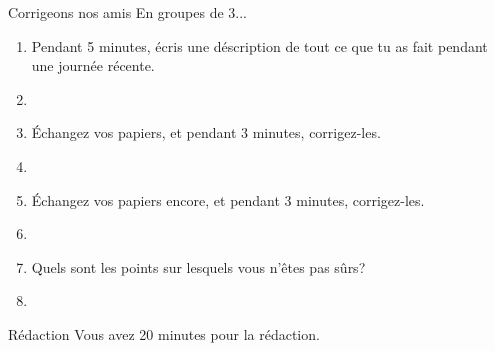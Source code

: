 \documentclass{beamer}
\begin{document}
  \begin{frame}{Corrigeons nos amis}
    En groupes de 3...
    \begin{enumerate}
      \item Pendant 5 minutes, écris une déscription de tout ce que tu as fait pendant une journée récente.
      \item[] 
      \item<2-> Échangez vos papiers, et pendant 3 minutes, corrigez-les.
      \item<2->[] 
      \item<3-> Échangez vos papiers encore, et pendant 3 minutes, corrigez-les.
      \item<3->[] 
      \item<4-> Quels sont les points sur lesquels vous n'êtes pas sûrs?
      \item<4->[] 
    \end{enumerate}
  \end{frame}

  \begin{frame}{Rédaction}
    Vous avez 20 minutes pour la rédaction.
  \end{frame}
\end{document}
